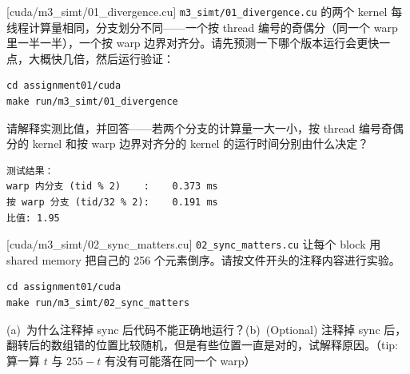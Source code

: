\documentclass[11pt,a4paper,fontset=none]{ctexart}
\begin{document}
[cuda/m3\_simt/01\_divergence.cu]
\texttt{m3\_simt/01\_divergence.cu} 的两个 kernel 每线程计算量相同，分支划分不同——一个按 thread 编号的奇偶分（同一个 warp 里一半一半），一个按 warp 边界对齐分。请先预测一下哪个版本运行会更快一点，大概快几倍，然后运行验证：

\begin{lstlisting}
cd assignment01/cuda
make run/m3_simt/01_divergence
\end{lstlisting}

请解释实测比值，并回答——若两个分支的计算量一大一小，按 thread 编号奇偶分的 kernel 和按 warp 边界对齐分的 kernel 的运行时间分别由什么决定？

\begin{lstlisting}
测试结果：
warp 内分支 (tid % 2)    :    0.373 ms
按 warp 分支 (tid/32 % 2):    0.191 ms
比值: 1.95
\end{lstlisting}


[cuda/m3\_simt/02\_sync\_matters.cu]
\texttt{02\_sync\_matters.cu} 让每个 block 用 shared memory 把自己的 256 个元素倒序。请按文件开头的注释内容进行实验。

\begin{lstlisting}
cd assignment01/cuda
make run/m3_simt/02_sync_matters
\end{lstlisting}

(a)~为什么注释掉 sync 后代码不能正确地运行？(b)~(Optional) 注释掉 sync 后，翻转后的数组错的位置比较随机，但是有些位置一直是对的，试解释原因。（tip: 算一算 $t$ 与 $255-t$ 有没有可能落在同一个 warp）
\end{document}
